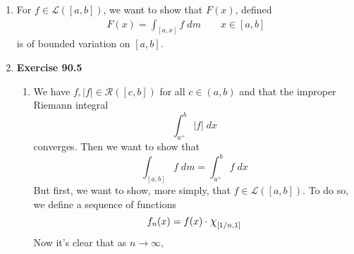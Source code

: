 \documentclass[12pt]{article}
\theoremstyle{plain}
\theoremstyle{definition}
\theoremstyle{remark}
\newcommand*{\Chi}{\mbox{\large$\chi$}} %
\begin{document}
\begin{enumerate}
\item For $f\in\mathscr{L}([a,b])$, we want to show that $F(x)$, defined
\begin{align*}
    F(x) = \int_{[a,x]} f \; dm \qquad x\in[a,b]
\end{align*}
is of bounded variation on $[a,b]$.


\item \textbf{Exercise 90.5}
\begin{enumerate} 

\item We have $f,|f|\in\mathscr{R}([c,b])$ for all $c\in(a,b)$ and that the improper Riemann integral
\begin{equation}
    \int^b_{a^+} |f| \; dx
\end{equation}
converges. Then we want to show that 
\[
    \int_{[a,b]} f \; dm = 
    \int^b_{a^+} f \; dx
\]
But first, we want to show, more simply, that $f\in\mathscr{L}([a,b])$. To do so, we define a sequence of functions
\[
    f_n(x) = f(x)\cdot\Chi_{[1/n,1]} 
\]
Now it's clear that as $n\rightarrow\infty$, 



\end{enumerate} 
    



\end{enumerate} 
\end{document}
